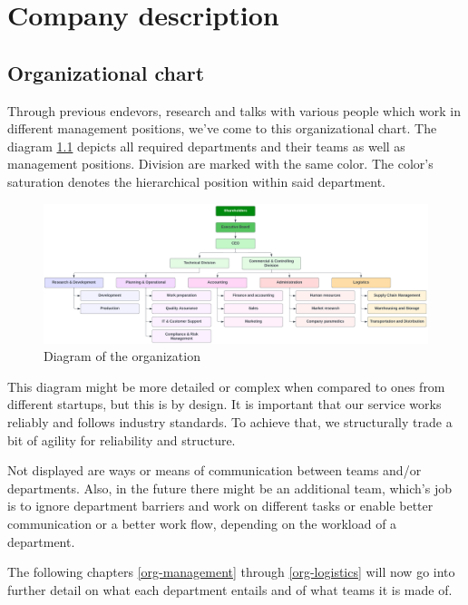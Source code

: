 \chapter{Company description}
\section{Organizational chart}\label{org-chart}
Through previous endevors, research and talks with various people which work in different management positions, we've come to this organizational chart. The diagram \ref{fig:organisational-chart} depicts all required departments and their teams as well as management positions. Division are marked with the same color. The color's saturation denotes the hierarchical position within said department.

\begin{figure}[!ht]
  \centering
  \includegraphics[width=\linewidth]{./images/organisational-chart.png}
  \caption[Organizational chart made with lucidchart.com]{Diagram of the organization}
  \label{fig:organisational-chart}
\end{figure}

This diagram might be more detailed or complex when compared to ones from different startups, but this is by design. It is important that our service works reliably and follows industry standards. To achieve that, we structurally trade a bit of agility for reliability and structure.

Not displayed are ways or means of communication between teams and/or departments. Also, in the future there might be an additional team, which's job is to ignore department barriers and work on different tasks or enable better communication or a better work flow, depending on the workload of a department.

The following chapters \ref{org-management} through \ref{org-logistics} will now go into further detail on what each department entails and of what teams it is made of.
